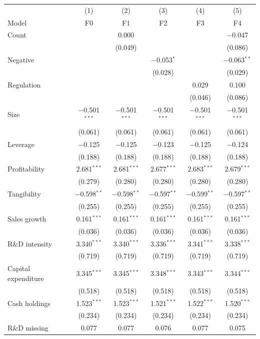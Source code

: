 \begin{tabular}{lccccc}
\toprule
 & (1) & (2) & (3) & (4) & (5) \\
Model & F0 & F1 & F2 & F3 & F4 \\
\midrule
Count &  & 0.000 &  &  & $-$0.047 \\
 &  & (0.049) &  &  & (0.086) \\
Negative &  &  & $-$0.053$^{*}$ &  & $-$0.063$^{**}$ \\
 &  &  & (0.028) &  & (0.029) \\
Regulation &  &  &  & 0.029 & 0.100 \\
 &  &  &  & (0.046) & (0.086) \\
Size & $-$0.501$^{***}$ & $-$0.501$^{***}$ & $-$0.501$^{***}$ & $-$0.501$^{***}$ & $-$0.501$^{***}$ \\
 & (0.061) & (0.061) & (0.061) & (0.061) & (0.061) \\
Leverage & $-$0.125 & $-$0.125 & $-$0.123 & $-$0.125 & $-$0.124 \\
 & (0.188) & (0.188) & (0.188) & (0.188) & (0.188) \\
Profitability & 2.681$^{***}$ & 2.681$^{***}$ & 2.677$^{***}$ & 2.683$^{***}$ & 2.679$^{***}$ \\
 & (0.279) & (0.280) & (0.280) & (0.280) & (0.280) \\
Tangibility & $-$0.598$^{**}$ & $-$0.598$^{**}$ & $-$0.597$^{**}$ & $-$0.599$^{**}$ & $-$0.597$^{**}$ \\
 & (0.255) & (0.255) & (0.255) & (0.255) & (0.255) \\
Sales growth & 0.161$^{***}$ & 0.161$^{***}$ & 0.161$^{***}$ & 0.161$^{***}$ & 0.161$^{***}$ \\
 & (0.036) & (0.036) & (0.036) & (0.036) & (0.036) \\
R\&D intensity & 3.340$^{***}$ & 3.340$^{***}$ & 3.336$^{***}$ & 3.341$^{***}$ & 3.338$^{***}$ \\
 & (0.719) & (0.719) & (0.719) & (0.719) & (0.719) \\
Capital expenditure & 3.345$^{***}$ & 3.345$^{***}$ & 3.348$^{***}$ & 3.343$^{***}$ & 3.344$^{***}$ \\
 & (0.518) & (0.518) & (0.518) & (0.518) & (0.518) \\
Cash holdings & 1.523$^{***}$ & 1.523$^{***}$ & 1.521$^{***}$ & 1.522$^{***}$ & 1.520$^{***}$ \\
 & (0.234) & (0.234) & (0.234) & (0.234) & (0.234) \\
R\&D missing & 0.077 & 0.077 & 0.076 & 0.077 & 0.075 \\

\end{tabular}
